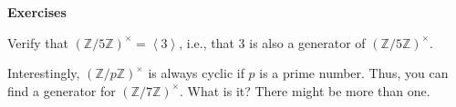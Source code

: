 \documentclass[12pt]{article}
\begin{document}
\begin{center}
{\Large \textbf{\textcolor{blue1}{{\ubuntu Exercises}}}}
\end{center}

\vspace{5mm}

 {\ubuntu Verify that $\left(\mathbb{Z}/5\mathbb{Z}\right)^{\times} = \left< 3 \right>$, i.e., that $3$ is also a generator of $\left(\mathbb{Z}/5\mathbb{Z}\right)^{\times}$.}

\vspace{45mm}

 {\ubuntu Interestingly, $(\mathbb{Z}/p\mathbb{Z})^{\times}$ is always cyclic if $p$ is a prime number. Thus, you can find a generator for $(\mathbb{Z}/7\mathbb{Z})^{\times}$. What is it? There might be more than one.}
\end{document}
